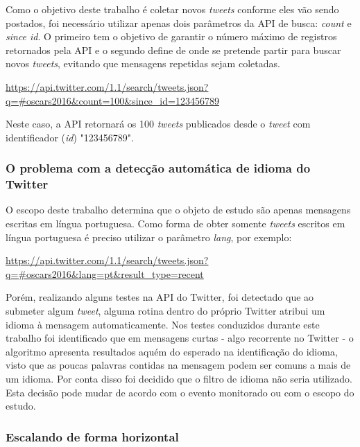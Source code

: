 Como o objetivo deste trabalho é coletar novos \textit{tweets} conforme eles vão sendo postados, foi necessário utilizar apenas dois parâmetros da API de busca: \textit{count} e \textit{since id}. O primeiro tem o objetivo de garantir o número máximo de registros retornados pela API e o segundo define de onde se pretende partir para buscar novos \textit{tweets}, evitando que mensagens repetidas sejam coletadas.

\url{https://api.twitter.com/1.1/search/tweets.json?q=#oscars2016&count=100&since_id=123456789}

Neste caso, a API retornará os 100 \textit{tweets} publicados desde o \textit{tweet} com identificador (\textit{id}) "123456789".

\subsubsection{O problema com a detecção automática de idioma do Twitter}

O escopo deste trabalho determina que o objeto de estudo são apenas mensagens escritas em língua portuguesa. Como forma de obter somente \textit{tweets} escritos em língua portuguesa é preciso utilizar o parâmetro \textit{lang}, por exemplo:

\url{https://api.twitter.com/1.1/search/tweets.json?q=#oscars2016&lang=pt&result_type=recent}

Porém, realizando alguns testes na API do Twitter, foi detectado que ao submeter algum \textit{tweet}, alguma rotina dentro do próprio Twitter atribui um idioma à mensagem automaticamente. Nos testes conduzidos durante este trabalho foi identificado que em mensagens curtas - algo recorrente no Twitter - o algoritmo apresenta resultados aquém do esperado na identificação do idioma, visto que as poucas palavras contidas na mensagem podem ser comuns a mais de um idioma. Por conta disso foi decidido que o filtro de idioma não seria utilizado. Esta decisão pode mudar de acordo com o evento monitorado ou com o escopo do estudo.

\subsubsection{Escalando de forma horizontal}

